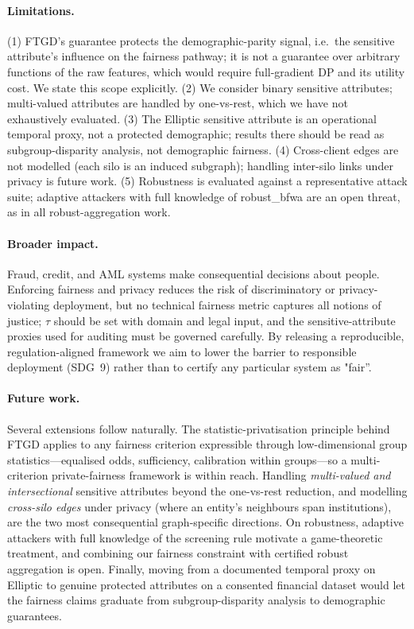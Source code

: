\documentclass[pdflatex,sn-mathphys-num]{sn-jnl}
\theoremstyle{thmstyleone}%
\theoremstyle{thmstyletwo}%
\theoremstyle{thmstylethree}%
\begin{document}
\paragraph{Limitations.}
(1) FTGD's guarantee protects the demographic-parity signal, i.e.\ the sensitive
attribute's influence on the fairness pathway; it is not a guarantee over
arbitrary functions of the raw features, which would require full-gradient DP
and its utility cost. We state this scope explicitly. (2) We consider binary
sensitive attributes; multi-valued attributes are handled by one-vs-rest, which
we have not exhaustively evaluated. (3) The Elliptic sensitive attribute is an
operational temporal proxy, not a protected demographic; results there should be
read as subgroup-disparity analysis, not demographic fairness. (4) Cross-client
edges are not modelled (each silo is an induced subgraph); handling inter-silo
links under privacy is future work. (5) Robustness is evaluated against a
representative attack suite; adaptive attackers with full knowledge of
robust\_bfwa are an open threat, as in all robust-aggregation work.

\paragraph{Broader impact.}
Fraud, credit, and AML systems make consequential decisions about people.
Enforcing fairness and privacy reduces the risk of discriminatory or
privacy-violating deployment, but no technical fairness metric captures all
notions of justice; $\tau$ should be set with domain and legal input, and the
sensitive-attribute proxies used for auditing must be governed carefully. By
releasing a reproducible, regulation-aligned framework we aim to lower the
barrier to responsible deployment (SDG~9) rather than to certify any particular
system as "fair''.

\paragraph{Future work.}
Several extensions follow naturally. The statistic-privatisation principle
behind FTGD applies to any fairness criterion expressible through
low-dimensional group statistics---equalised odds, sufficiency, calibration
within groups---so a multi-criterion private-fairness framework is within reach.
Handling \emph{multi-valued and intersectional} sensitive attributes beyond the
one-vs-rest reduction, and modelling \emph{cross-silo edges} under privacy
(where an entity's neighbours span institutions), are the two most consequential
graph-specific directions. On robustness, adaptive attackers with full knowledge
of the screening rule motivate a game-theoretic treatment, and combining our
fairness constraint with certified robust aggregation is open. Finally, moving
from a documented temporal proxy on Elliptic to genuine protected attributes on
a consented financial dataset would let the fairness claims graduate from
subgroup-disparity analysis to demographic guarantees.
\end{document}
